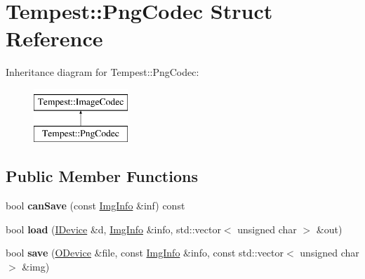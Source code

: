 \hypertarget{struct_tempest_1_1_png_codec}{\section{Tempest\+:\+:Png\+Codec Struct Reference}
\label{struct_tempest_1_1_png_codec}
}
Inheritance diagram for Tempest\+:\+:Png\+Codec\+:\begin{figure}[H]
\begin{center}
\leavevmode
\includegraphics[height=2.000000cm]{struct_tempest_1_1_png_codec}
\end{center}
\end{figure}
\subsection*{Public Member Functions}
\begin{DoxyCompactItemize}
\item 
\hypertarget{struct_tempest_1_1_png_codec_aa94f0e7a4627bb6f9c33e91ebcd1cd0c}{bool {\bfseries can\+Save} (const \hyperlink{struct_tempest_1_1_pixmap_1_1_img_info}{Img\+Info} \&inf) const }\label{struct_tempest_1_1_png_codec_aa94f0e7a4627bb6f9c33e91ebcd1cd0c}

\item 
\hypertarget{struct_tempest_1_1_png_codec_a88a729010aba234d83a3b8f06d260606}{bool {\bfseries load} (\hyperlink{class_tempest_1_1_i_device}{I\+Device} \&d, \hyperlink{struct_tempest_1_1_pixmap_1_1_img_info}{Img\+Info} \&info, std\+::vector$<$ unsigned char $>$ \&out)}\label{struct_tempest_1_1_png_codec_a88a729010aba234d83a3b8f06d260606}

\item 
\hypertarget{struct_tempest_1_1_png_codec_a54433332c55ab6233abc8f1f903bdffd}{bool {\bfseries save} (\hyperlink{class_tempest_1_1_o_device}{O\+Device} \&file, const \hyperlink{struct_tempest_1_1_pixmap_1_1_img_info}{Img\+Info} \&info, const std\+::vector$<$ unsigned char $>$ \&img)}\label{struct_tempest_1_1_png_codec_a54433332c55ab6233abc8f1f903bdffd}

\end{DoxyCompactItemize}
